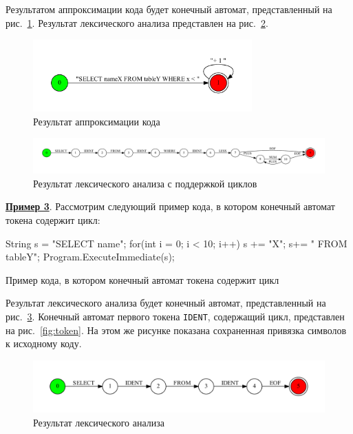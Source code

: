 \documentclass{matmex-diploma}
\begin{document}
Результатом аппроксимации кода будет конечный автомат, представленный на рис.~\ref{fig:while_appr}. Результат лексического анализа представлен на рис.~\ref{fig:while_ex}.

\begin{figure}[h!]
\begin{center}
\includegraphics[width=0.75\textwidth]{while_appr}
\caption{Результат аппроксимации кода}
\label{fig:while_appr} 
\end{center}
\end{figure}


\begin{figure}[h!]
\begin{center}
\includegraphics[width=1.0\textwidth]{WhileEx}
\caption{Результат лексического анализа с поддержкой циклов}
\label{fig:while_ex} 
\end{center}
\end{figure}

\textbf{\underline{Пример 3}}. 
Рассмотрим следующий пример кода, в котором конечный автомат токена содержит цикл:

\begin{listing}[H]
    \begin{pyglist}[language=csharp,numbers=left,numbersep=5pt]
   String s = "SELECT name";
   for(int i = 0; i < 10; i++){ s += "X";}
   s+= " FROM tableY";
   Program.ExecuteImmediate(s);
    \end{pyglist}
\caption{Пример кода, в котором конечный автомат токена содержит цикл}
\label{lst:example}
\end{listing}

Результат лексического анализа будет конечный автомат, представленный на рис.~\ref{fig:TokenEx}. Конечный автомат первого токена \verb|IDENT|, содержащий цикл, представлен на рис.~\ref{fig:token}. На этом же рисунке показана сохраненная привязка символов к исходному коду. 

\begin{figure}[h!]
\begin{center}
\includegraphics[width=1.0\textwidth]{TokenEx}
\caption{Результат лексического анализа}
\label{fig:TokenEx} 
\end{center}
\end{figure}
\end{document}
